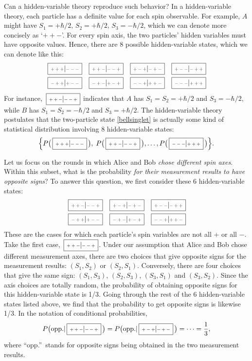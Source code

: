 \documentclass[prx,12pt]{revtex4-2}
\def\hvbox[#1]#2{\,\boxed{\scalebox{0.7}{$\,#1$}|\scalebox{0.7}{$#2\,$}}}
\begin{document}
Can a hidden-variable theory reproduce such behavior?  In a
hidden-variable theory, each particle has a definite value for each
spin observable.  For example, $A$ might have $S_1 = +\hbar/2, \, S_2
= +\hbar/2, \, S_3 = -\hbar/2$, which we can denote more concisely as
`$++-$'.  For every spin axis, the two particles' hidden variables
must have opposite values.  Hence, there are $8$ possible
hidden-variable states, which we can denote like this:
\begin{align*}
  \begin{aligned}
    \hvbox[+++]{---} \;\;\;
    \hvbox[++-]{--+} \;\;\;
    \hvbox[+-+]{-+-} \;\;\;
    \hvbox[+--]{-++}\\
    \hvbox[-++]{+--} \;\;\;
    \hvbox[-+-]{+-+} \;\;\;
    \hvbox[--+]{++-} \;\;\;
    \hvbox[---]{+++}
  \end{aligned}
\end{align*}
For instance, $\hvbox[++-]{--+}$ indicates that $A$ has $S_1 = S_2 =
+\hbar/2$ and $S_3 = -\hbar/2$, while $B$ has $S_1 = S_2 = -\hbar/2$
and $S_3 = +\hbar/2$.  The hidden-variable theory postulates that the
two-particle state \eqref{bellsinglet} is actually some kind of
statistical distribution involving 8 hidden-variable states:
\begin{equation*}
  \Big\{ P\big(\hvbox[+++]{---}\,\big), \;P\big(\hvbox[++-]{--+}\,\big),
  \dots, P\big(\hvbox[---]{+++}\,\big) \Big\}.
\end{equation*}

Let us focus on the rounds in which Alice and Bob \textit{chose
  different spin axes}.  Within this subset, what is the probability
\textit{for their measurement results to have opposite signs}?  To
answer this question, we first consider these 6 hidden-variable
states:
\begin{align*}
  \begin{aligned}
    \hvbox[++-]{--+} \;\;\;
    \hvbox[+-+]{-+-} \;\;\;
    \hvbox[+--]{-++}\\
    \hvbox[-++]{+--} \;\;\;
    \hvbox[-+-]{+-+} \;\;\;
    \hvbox[--+]{++-}
  \end{aligned}
\end{align*}
These are the cases for which each particle's spin variables are not
all $+$ or all $-$.  Take the first case, $\hvbox[++-]{--+}$.  Under
our assumption that Alice and Bob chose different measurement axes,
there are two choices that give opposite signs for the measurement
results: $(S_1,S_2)$ or $(S_2,S_1)$.  Conversely, there are four
choices that give the same sign: $(S_1,S_3)$, $(S_2,S_3)$, $(S_3,S_1)$
and $(S_3, S_2)$.  Since the axis choices are totally random, the
probability of obtaining opposite signs for this hidden-variable state
is 1/3.  Going through the rest of the 6 hidden-variable states listed
above, we find that the probability to get opposite signs is likewise
1/3.  In the notation of conditional probabilities,
\begin{equation}
  P\big(\textrm{opp.} | \hvbox[++-]{--+}\,\big) =
  P\big(\textrm{opp.} | \hvbox[+-+]{-+-}\,\big) = \cdots = \frac{1}{3},
  \label{bell1}
\end{equation}
where ``opp.''~stands for opposite signs being obtained in the two
measurement results.
\end{document}
